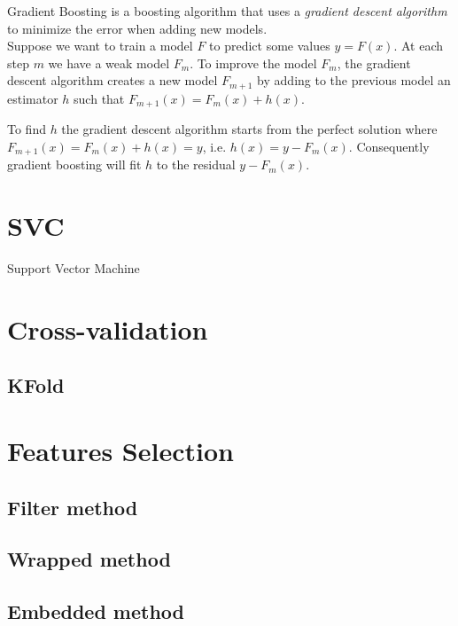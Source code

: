 Gradient Boosting is a boosting algorithm that uses a \textit{gradient descent algorithm} to minimize the error when adding new models.\\

Suppose we want to train a model $F$ to predict some values $y = F(x)$. At each step $m$ we have a weak model $F_m$. To improve the model $F_m$, the gradient descent algorithm creates a new model $F_{m+1}$ by adding to the previous model an estimator $h$ such that $F_{m+1}(x) = F_m(x) + h(x)$. \cite{gradientBoostLi}

To find $h$ the gradient descent algorithm starts from the perfect solution where $F_{m+1}(x) = F_m(x) + h(x) = y$, i.e. $h(x) = y - F_m(x)$. Consequently gradient boosting will fit $h$ to the residual $y - F_m(x)$.
\section{SVC}
Support Vector Machine
\section{Cross-validation}
\subsection{KFold}

\section{Features Selection}
\subsection{Filter method}
\subsection{Wrapped method}
\subsection{Embedded method}